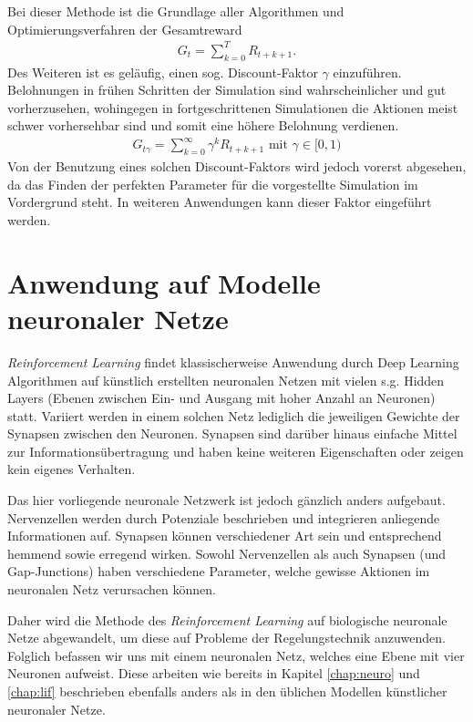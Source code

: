 	Bei dieser Methode ist die Grundlage aller Algorithmen und Optimierungsverfahren der Gesamtreward
	\begin{align}
		G_t = \sum_{k=0}^{T}R_{t+k+1}.
	\end{align}
	Des Weiteren ist es geläufig, einen sog. \glqq Discount-Faktor\grqq{} $\gamma$ einzuführen. Belohnungen in frühen Schritten der Simulation sind wahrscheinlicher und gut vorherzusehen, wohingegen in fortgeschrittenen Simulationen die Aktionen meist schwer vorhersehbar sind und somit eine höhere Belohnung verdienen.
	\begin{align}
		G_{t\gamma} = \sum_{k=0}^{\infty}\gamma^k R_{t+k+1}\text{ mit }\gamma\in[0,1)
	\end{align}
	Von der Benutzung eines solchen Discount-Faktors wird jedoch vorerst abgesehen, da das Finden der perfekten Parameter für die vorgestellte Simulation im Vordergrund steht. In weiteren Anwendungen kann dieser Faktor eingeführt werden.
	
\section{Anwendung auf Modelle neuronaler Netze}
\label{sec:rl_neuro}
	\textit{Reinforcement Learning} findet klassischerweise Anwendung durch Deep Learning Algorithmen auf künstlich erstellten neuronalen Netzen mit vielen s.g. \glqq Hidden Layers\grqq{} (Ebenen zwischen Ein- und Ausgang mit hoher Anzahl an Neuronen) statt. Variiert werden in einem solchen Netz lediglich die jeweiligen Gewichte der Synapsen zwischen den Neuronen. Synapsen sind darüber hinaus einfache Mittel zur Informationsübertragung und haben keine weiteren Eigenschaften oder zeigen kein eigenes Verhalten.
	
	Das hier vorliegende neuronale Netzwerk ist jedoch gänzlich anders aufgebaut. Nervenzellen werden durch Potenziale beschrieben und integrieren anliegende Informationen auf. Synapsen können verschiedener Art sein und entsprechend hemmend sowie erregend wirken. Sowohl Nervenzellen als auch Synapsen (und Gap-Junctions) haben verschiedene Parameter, welche gewisse Aktionen im neuronalen Netz verursachen können.
	
	Daher wird die Methode des \textit{Reinforcement Learning} auf biologische neuronale Netze abgewandelt, um diese auf Probleme der Regelungstechnik anzuwenden. Folglich befassen wir uns mit einem neuronalen Netz, welches eine Ebene mit vier Neuronen aufweist. Diese  arbeiten wie bereits in Kapitel \ref{chap:neuro} und \ref{chap:lif} beschrieben ebenfalls anders als in den üblichen Modellen künstlicher neuronaler Netze.
	
